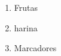 \documentclass{article}
\begin{document}
    \renewcommand{\labelenumi}{\Roman{enumi}}
    \begin{enumerate}
        \item Frutas
        \item harina
        \item Marcadores
    \end{enumerate}
\end{document}
